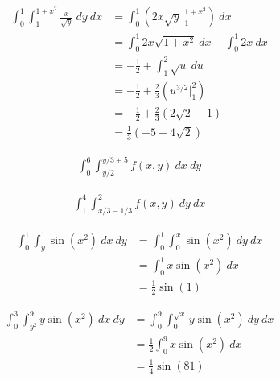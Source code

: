 \documentclass[10pt]{extarticle}
\begin{document}
\begin{problem}{16.2}
\begin{description}[font=\normalfont]
\begin{center}
        \end{center}
        \begin{align*}
          \int_{0}^{1}\int_{1}^{1 + x^2}\frac{x}{\sqrt{y}}~dy~dx &= \int_{0}^{1}\left(2x\sqrt{y}\biggr\vert_{1}^{1 + x^2}\right)~dx\\
                                                                 &= \int_{0}^{1}2x\sqrt{1 + x^2}~dx - \int_{0}^{1}2x~dx\\
                                                                 &= -\frac{1}{2} + \int_{1}^{2}\sqrt{u}~du\tag*{$u = 1 + x^2,~du = 2x~dx$}\\
                                                                 &= -\frac{1}{2} + \frac{2}{3}\left(u^{3/2}\biggr\vert_{1}^{2}\right)\\
                                                                 &= -\frac{1}{2} + \frac{2}{3}\left(2\sqrt{2} - 1 \right)\\
                                                                 &= \frac{1}{3}\left(-5 + 4\sqrt{2}\right)
        \end{align*}
      \item[24:]
        \begin{align*}
          \int_{0}^{6}\int_{y/2}^{y/3+5}f(x,y)~dx~dy
        \end{align*}
      \item[26:]
        \begin{align*}
          \int_{1}^{4}\int_{x/3-1/3}^{2}f(x,y)~dy~dx
        \end{align*}
      \item[44:]
        \begin{align*}
          \int_{0}^{1}\int_{y}^{1}\sin(x^2)~dx~dy &= \int_{0}^{1}\int_{0}^{x}\sin(x^2)~dy~dx\\
                                                  &= \int_{0}^{1}x\sin(x^2)~dx\\
                                                  &= \frac{1}{2}\sin(1)
        \end{align*}
      \item[46:]
        \begin{align*}
          \int_{0}^{3}\int_{y^2}^{9}y\sin(x^2)~dx~dy &= \int_{0}^{9}\int_{0}^{\sqrt{x}}y\sin(x^2)~dy~dx\\
                                                     &= \frac{1}{2}\int_{0}^{9}x\sin(x^2)~dx\\
                                                     &= \frac{1}{4}\sin(81)
        \end{align*}
    \end{description}
  \end{problem}
\end{document}
